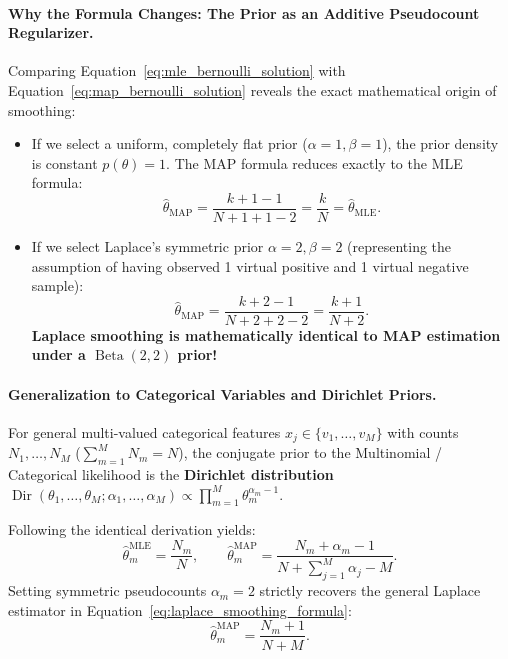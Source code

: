 \paragraph{Why the Formula Changes: The Prior as an Additive Pseudocount Regularizer.}
Comparing Equation~\eqref{eq:mle_bernoulli_solution} with Equation~\eqref{eq:map_bernoulli_solution} reveals the exact mathematical origin of smoothing:
\begin{itemize}
  \item If we select a uniform, completely flat prior ($\alpha = 1, \beta = 1$), the prior density is constant $p(\theta) = 1$. The MAP formula reduces exactly to the MLE formula:
  \begin{equation}
  \hat{\theta}_{\text{MAP}} = \frac{k + 1 - 1}{N + 1 + 1 - 2} = \frac{k}{N} = \hat{\theta}_{\text{MLE}}.
  \end{equation}
  \item If we select Laplace's symmetric prior $\alpha = 2, \beta = 2$ (representing the assumption of having observed 1 virtual positive and 1 virtual negative sample):
  \begin{equation}
  \hat{\theta}_{\text{MAP}} = \frac{k + 2 - 1}{N + 2 + 2 - 2} = \frac{k + 1}{N + 2}.
  \end{equation}
  \textbf{Laplace smoothing is mathematically identical to MAP estimation under a $\operatorname{Beta}(2, 2)$ prior!}
\end{itemize}

\paragraph{Generalization to Categorical Variables and Dirichlet Priors.}
For general multi-valued categorical features $x_j \in \{v_1, \dots, v_M\}$ with counts $N_1, \dots, N_M$ ($\sum_{m=1}^M N_m = N$), the conjugate prior to the Multinomial / Categorical likelihood is the \textbf{Dirichlet distribution} $\operatorname{Dir}(\theta_1, \dots, \theta_M; \alpha_1, \dots, \alpha_M) \propto \prod_{m=1}^M \theta_m^{\alpha_m - 1}$. 

Following the identical derivation yields:
\begin{equation}
\hat{\theta}_m^{\text{MLE}} = \frac{N_m}{N}, \qquad \hat{\theta}_m^{\text{MAP}} = \frac{N_m + \alpha_m - 1}{N + \sum_{j=1}^M \alpha_j - M}.
\label{eq:dirichlet_map_formula}
\end{equation}
Setting symmetric pseudocounts $\alpha_m = 2$ strictly recovers the general Laplace estimator in Equation~\eqref{eq:laplace_smoothing_formula}:
\begin{equation}
\hat{\theta}_m^{\text{MAP}} = \frac{N_m + 1}{N + M}.
\end{equation}

